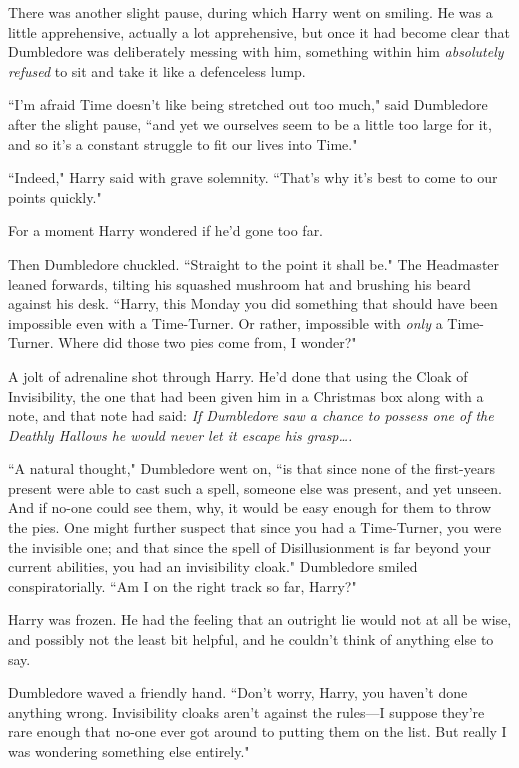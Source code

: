 There was another slight pause, during which Harry went on smiling. He was a little apprehensive, actually a lot apprehensive, but once it had become clear that Dumbledore was deliberately messing with him, something within him \emph{absolutely refused} to sit and take it like a defenceless lump.

``I'm afraid Time doesn't like being stretched out too much," said Dumbledore after the slight pause, ``and yet we ourselves seem to be a little too large for it, and so it's a constant struggle to fit our lives into Time."

``Indeed," Harry said with grave solemnity. ``That's why it's best to come to our points quickly."

For a moment Harry wondered if he'd gone too far.

Then Dumbledore chuckled. ``Straight to the point it shall be." The Headmaster leaned forwards, tilting his squashed mushroom hat and brushing his beard against his desk. ``Harry, this Monday you did something that should have been impossible even with a Time-Turner. Or rather, impossible with \emph{only} a Time-Turner. Where did those two pies come from, I wonder?"

A jolt of adrenaline shot through Harry. He'd done that using the Cloak of Invisibility, the one that had been given him in a Christmas box along with a note, and that note had said: \emph{If Dumbledore saw a chance to possess one of the Deathly Hallows he would never let it escape his grasp….}

``A natural thought," Dumbledore went on, ``is that since none of the first-years present were able to cast such a spell, someone else was present, and yet unseen. And if no-one could see them, why, it would be easy enough for them to throw the pies. One might further suspect that since you had a Time-Turner, you were the invisible one; and that since the spell of Disillusionment is far beyond your current abilities, you had an invisibility cloak." Dumbledore smiled conspiratorially. ``Am I on the right track so far, Harry?"

Harry was frozen. He had the feeling that an outright lie would not at all be wise, and possibly not the least bit helpful, and he couldn't think of anything else to say.

Dumbledore waved a friendly hand. ``Don't worry, Harry, you haven't done anything wrong. Invisibility cloaks aren't against the rules—I suppose they're rare enough that no-one ever got around to putting them on the list. But really I was wondering something else entirely."

